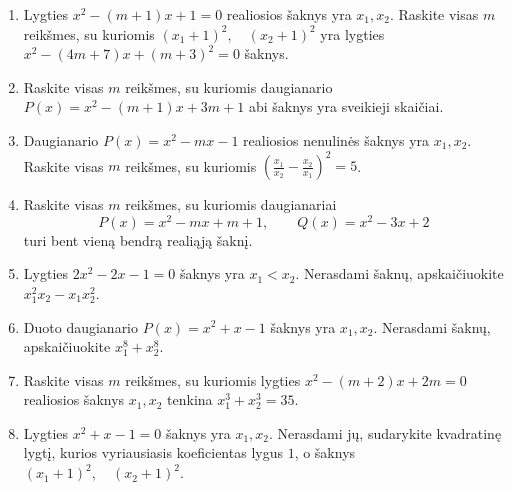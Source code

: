 \documentclass[11pt,a4paper]{article}
\begin{document}
\begin{enumerate}
\item \begin{minipage}[t]{\linewidth}Lygties \(x^{2}-\left(m + 1\right)x+1=0\) realiosios šaknys yra \(x_1,x_2\). Raskite visas \(m\) reikšmes, su kuriomis \mbox{\((x_1+1)^2,\quad(x_2+1)^2\)} yra lygties \(x^{2}-\left(4 m + 7\right)x+\left(m + 3\right)^{2}=0\) šaknys.\end{minipage}
\item \begin{minipage}[t]{\linewidth}Raskite visas \(m\) reikšmes, su kuriomis daugianario \(P(x)=x^{2}-\left(m + 1\right)x+3 m + 1\) abi šaknys yra sveikieji skaičiai.\end{minipage}
\item \begin{minipage}[t]{\linewidth}Daugianario \(P(x)=x^{2}-mx-1\) realiosios nenulinės šaknys yra \(x_1,x_2\). Raskite visas \(m\) reikšmes, su kuriomis \mbox{\(\left(\frac{x_1}{x_2}-\frac{x_2}{x_1}\right)^2=5\)}.\end{minipage}
\newpage
\item \begin{minipage}[t]{\linewidth}Raskite visas \(m\) reikšmes, su kuriomis daugianariai \[P(x)=x^{2}-mx+m + 1,\qquad Q(x)=x^{2}-3x+2\] turi bent vieną bendrą realiąją šaknį.\end{minipage}
\item \begin{minipage}[t]{\linewidth}Lygties \(2x^{2}-2x-1=0\) šaknys yra \(x_1<x_2\). Nerasdami šaknų, apskaičiuokite \mbox{\(x_{1}^{2} x_{2} - x_{1} x_{2}^{2}\)}.\end{minipage}
\item \begin{minipage}[t]{\linewidth}Duoto daugianario \(P(x)=x^{2}+x-1\) šaknys yra \(x_1,x_2\). Nerasdami šaknų, apskaičiuokite \mbox{\(x_{1}^{8} + x_{2}^{8}\)}.\end{minipage}
\item \begin{minipage}[t]{\linewidth}Raskite visas \(m\) reikšmes, su kuriomis lygties \(x^{2}-\left(m + 2\right)x+2 m=0\) realiosios šaknys \(x_1,x_2\) tenkina \mbox{\(x_1^3+x_2^3=35\)}.\end{minipage}
\item \begin{minipage}[t]{\linewidth}Lygties \(x^{2}+x-1=0\) šaknys yra \(x_1,x_2\). Nerasdami jų, sudarykite kvadratinę lygtį, kurios vyriausiasis koeficientas lygus \(1\), o šaknys \mbox{\(\left(x_{1} + 1\right)^{2},\quad \left(x_{2} + 1\right)^{2}\)}.\end{minipage}

\end{enumerate}
\end{document}
